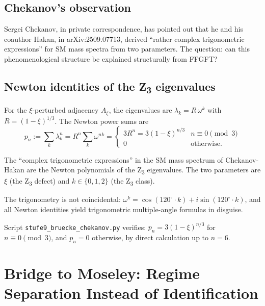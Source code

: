 \subsection{Chekanov's observation}

Sergei Chekanov, in private correspondence, has pointed out that he and his coauthor Hakan, in arXiv:2509.07713, derived ``rather complex trigonometric expressions'' for SM mass spectra from two parameters. The question: can this phenomenological structure be explained structurally from FFGFT?

\subsection[Newton identities of the Z3 eigenvalues]{Newton identities of the Z\textsubscript{3} eigenvalues}

For the \(\xi\)-perturbed adjacency \(A_\xi\), the eigenvalues are \(\lambda_k = R\,\omega^k\) with \(R = (1-\xi)^{1/3}\). The Newton power sums are
\begin{equation}
p_n := \sum_k \lambda_k^n = R^n \sum_k \omega^{nk} = \begin{cases} 3 R^n = 3 (1-\xi)^{n/3} & n \equiv 0 \pmod 3 \\ 0 & \text{otherwise.} \end{cases}
\end{equation}

\begin{keyresult}
The ``complex trigonometric expressions'' in the SM mass spectrum of Chekanov-Hakan are the Newton polynomials of the Z\textsubscript{3} eigenvalues. The two parameters are \(\xi\) (the Z\textsubscript{3} defect) and \(k \in \{0, 1, 2\}\) (the Z\textsubscript{3} class).
\end{keyresult}

The trigonometry is not coincidental: \(\omega^k = \cos(120^\circ \cdot k) + i \sin(120^\circ \cdot k)\), and all Newton identities yield trigonometric multiple-angle formulas in disguise.

Script \texttt{stufe9\_bruecke\_chekanov.py} verifies: \(p_n = 3(1-\xi)^{n/3}\) for \(n \equiv 0 \pmod 3\), and \(p_n = 0\) otherwise, by direct calculation up to \(n = 6\).

\section{Bridge to Moseley: Regime Separation Instead of Identification}
\label{sec:moseley}

